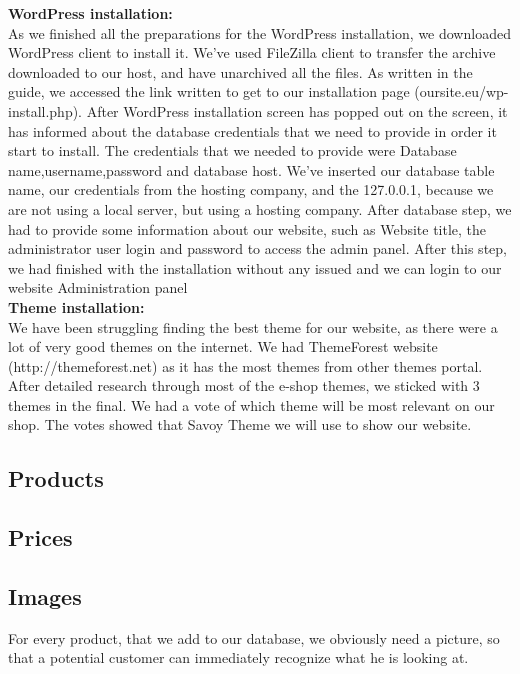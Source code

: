 \documentclass[12p]{article}
\begin{document}
\textbf{WordPress installation:}
\\
As we finished all the preparations for the WordPress installation, we downloaded WordPress client to install it. We’ve used FileZilla client to transfer the archive downloaded to our host, and have unarchived all the files. As written in the guide, we accessed the link written to get to our installation page (oursite.eu/wp-install.php). After WordPress installation screen has popped out on the screen, it has informed about the database credentials that we need to provide in order it start to install. The credentials that we needed to provide were Database name,username,password and database host. We’ve inserted our database table name, our credentials from the hosting company, and the 127.0.0.1, because we are not using a local server, but using a hosting company. After database step, we had to provide some information about our website, such as Website title, the administrator user login and password to access the admin panel. After this step, we had finished with the installation without any issued and we can login to our website Administration panel \\

\textbf{Theme installation:}
\\
We have been struggling finding the best theme for our website, as there were a lot of very good themes on the internet. We had ThemeForest website (http://themeforest.net) as it has the most themes from other themes portal. After detailed research through most of the e-shop themes, we sticked with 3 themes in the final. We had a vote of which theme will be most relevant on our shop. The votes showed that Savoy Theme we will use to show our website.

\subsection{Products}

\subsection{Prices}

\subsection{Images}

For every product, that we add to our database, we obviously need a picture, so that a potential customer can immediately recognize what he is looking at. 
\end{document}
